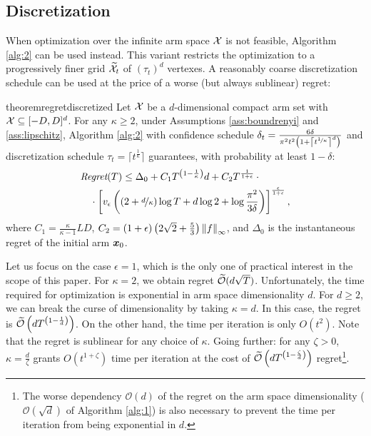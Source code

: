 \documentclass{article}
\begin{document}
\subsection{Discretization}
When optimization over the infinite arm space $\Xspace$ is not feasible, Algorithm \ref{alg:2} can be used instead. This variant restricts the optimization to a progressively finer grid $\wt{\Xspace}_t$ of $(\tau_t)^d$ vertexes. A reasonably coarse discretization schedule can be used at the price of a worse (but always sublinear) regret:
%
\begin{restatable}{theorem}{regretdiscretized}\label{th:regretdiscretized}
	Let $\Xspace$ be a $d$-dimensional compact arm set with $\Xspace \subseteq [-D,D]^d$. For any $\kappa\geq2$, under Assumptions \ref{ass:boundrenyi} and \ref{ass:lipschitz}, Algorithm \ref{alg:2} with confidence schedule ${\delta_t = \frac{6\delta}{\pi^2t^2\left(1+\left\lceil t^{\nicefrac{1}{\kappa}}\right\rceil^d\right)}}$ and discretization schedule $\tau_t=\lceil t^{\frac{1}{\kappa}} \rceil$ guarantees, with probability at least $1-\delta$:
	\begin{align*}
	&\Reg(T) \leq \Delta_0  + C_1T^{\left(1-\frac{1}{\kappa}\right)}d
	+ C_2
	T^{\frac{1}{1+\epsilon}} \,\cdot
	\\&\quad\cdot\left[v_{\epsilon}
	\left(\left(2+ \nicefrac{d}{\kappa}\right)\log T + d\log 2 + \log\frac{\pi^2}{3\delta}\right)\right]^{\frac{\epsilon}{1+\epsilon}},
	\end{align*}
	where $C_1=\frac{\kappa}{\kappa-1}LD$, $C_2=(1+\epsilon)\left(2\sqrt{2}+\frac{5}{3}\right)\norm[\infty]{f}$, and $\Delta_0$ is the instantaneous regret of the initial arm $\vx_0$.
\end{restatable}
%
Let us focus on the case $\epsilon=1$, which is the only one of practical interest in the scope of this paper.
For $\kappa=2$, we obtain regret $\wt{\mathcal{O}}(d\sqrt{T})$. Unfortunately, the time required for optimization is exponential in arm space dimensionality $d$. For $d\geq 2$, we can break the curse of dimensionality by taking $\kappa=d$. In this case, the regret is $\wt{\mathcal{O}}\left(dT^{\left(1-\frac{1}{d}\right)}\right)$. On the other hand, the time per iteration is only $O(t^2)$. Note that the regret is sublinear for any choice of $\kappa$. 
Going further: for any $\zeta>0$, $\kappa=\frac{d}{\zeta}$ grants $O(t^{1+\zeta})$ time per iteration at the cost of $\wt{\mathcal{O}}\left(dT^{\left(1-\frac{\zeta}{d}\right)}\right)$ regret\footnote{The worse dependency $\mathcal{O}(d)$ of the regret on the arm space dimensionality (\wrt $\mathcal{O}(\sqrt{d})$ of Algorithm \ref{alg:1}) is also necessary to prevent the time per iteration from being exponential in $d$.}. 
\end{document}
